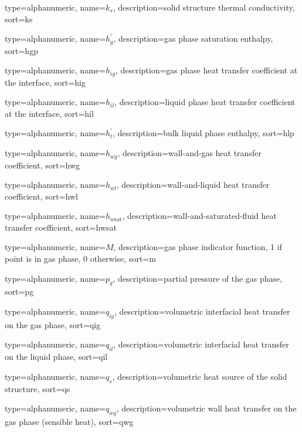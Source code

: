 {
  type=alphanumeric,
	name={\ensuremath{k_s}},
	description={solid structure thermal conductivity},
	sort={ks}
}

{
  type=alphanumeric,
	name={\ensuremath{h^\prime_g}},
	description={gas phase saturation enthalpy},
	sort={hgp}
}

{
  type=alphanumeric,
	name={\ensuremath{h_{ig}}},
	description={gas phase heat transfer coefficient at the interface},
	sort={hig}
}

{
  type=alphanumeric,
	name={\ensuremath{h_{il}}},
	description={liquid phase heat transfer coefficient at the interface},
	sort={hil}
}

{
  type=alphanumeric,
	name={\ensuremath{h^\prime_l}},
	description={bulk liquid phase enthalpy},
	sort={hlp}
}

{
  type=alphanumeric,
	name={\ensuremath{h_{wg}}},
	description={wall-and-gas heat transfer coefficient},
	sort={hwg}
}

{
  type=alphanumeric,
	name={\ensuremath{h_{wl}}},
	description={wall-and-liquid heat transfer coefficient},
	sort={hwl}
}

{
  type=alphanumeric,
	name={\ensuremath{h_{w\text{sat}}}},
	description={wall-and-saturated-fluid heat transfer coefficient},
	sort={hwsat}
}

{
  type=alphanumeric,
	name={\ensuremath{M}},
	description={gas phase indicator function, 1 if point is in gas phase, 0 otherwise},
	sort={m}
}

{
  type=alphanumeric,
	name={\ensuremath{p_g}},
	description={partial pressure of the gas phase},
	sort={pg}
}

{
  type=alphanumeric,
	name={\ensuremath{q_{ig}}},
	description={volumetric interfacial heat transfer on the gas phase},
	sort={qig}
}

{
  type=alphanumeric,
	name={\ensuremath{q_{il}}},
	description={volumetric interfacial heat transfer on the liquid phase},
	sort={qil}
}

{
  type=alphanumeric,
	name={\ensuremath{q_s}},
	description={volumetric heat source of the solid structure},
	sort={qs}
}

{
  type=alphanumeric,
	name={\ensuremath{q_{wg}}},
	description={volumetric wall heat transfer on the gas phase (sensible heat)},
	sort={qwg}
}

